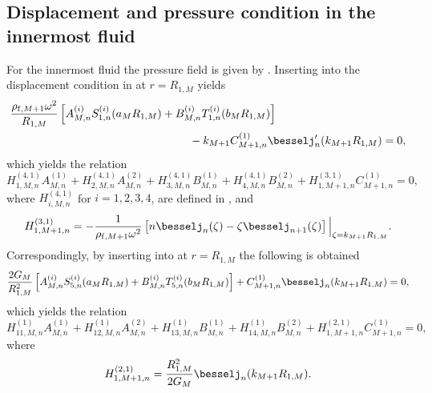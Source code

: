 \subsection{Displacement and pressure condition in the innermost fluid}
For the innermost fluid the pressure field is given by . Inserting  into the displacement condition in  at $r=R_{1,M}$ yields
\begin{align*}
	&\frac{\rho_{\mathrm{f},M+1}\omega^2}{R_{1,M}}\left[A_{M,n}^{(i)} S_{1,n}^{(i)}(a_M R_{1,M}) + B_{M,n}^{(i)} T_{1,n}^{(i)}(b_M R_{1,M})\right] \\
	&{\hskip16em\relax}- k_{M+1}C_{M+1,n}^{(1)}\besselj_n'(k_{M+1} R_{1,M}) = 0,
\end{align*}
which yields the relation
\begin{equation}
	H_{1,M,n}^{(4,1)}A_{M,n}^{(1)} + H_{2,M,n}^{(4,1)}A_{M,n}^{(2)} + H_{3,M,n}^{(4,1)}B_{M,n}^{(1)} + H_{4,M,n}^{(4,1)}B_{M,n}^{(2)} + H_{1,M+1,n}^{(3,1)}C_{M+1,n}^{(1)} = 0,
\end{equation}
where $H_{i,M,n}^{(4,1)}$ for $i=1,2,3,4$, are defined in , and 
\begin{equation}\label{Eq1:K311Mp1}
	H_{1,M+1,n}^{(3,1)} = -\frac{1}{\rho_{\mathrm{f},M+1}\omega^2}\left[n\besselj_n(\zeta) - \zeta \besselj_{n+1}(\zeta)\right]\Big\vert_{\zeta=k_{M+1}R_{1,M}}.
\end{equation}
Correspondingly, by inserting  into  at $r=R_{1,M}$ the following is obtained
\begin{equation*}
	\frac{2G_M}{R_{1,M}^2}\left[A_{M,n}^{(i)} S_{5,n}^{(i)}(a_M R_{1,M}) + B_{M,n}^{(i)} T_{5,n}^{(i)}(b_M R_{1,M})\right] + C_{M+1,n}^{(1)} \besselj_n(k_{M+1} R_{1,M})  = 0,
\end{equation*}
which yields the relation
\begin{equation}
	H_{11,M,n}^{(1)}A_{M,n}^{(1)} + H_{12,M,n}^{(1)}A_{M,n}^{(2)} + H_{13,M,n}^{(1)}B_{M,n}^{(1)} + H_{14,M,n}^{(1)}B_{M,n}^{(2)}+ H_{1,M+1,n}^{(2,1)}C_{M+1,n}^{(1)} = 0,
\end{equation}
where
\begin{equation}\label{Eq1:K211Mp1}
	H_{1,M+1,n}^{(2,1)} = \frac{R_{1,M}^2}{2G_M}\besselj_n(k_{M+1}R_{1,M}).
\end{equation}



